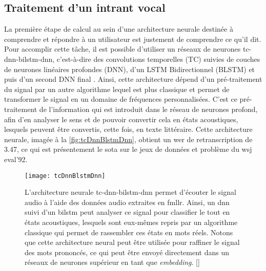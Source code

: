 \subsection{Traitement d'un intrant vocal}
La première étape de calcul au sein d’une architecture neurale destinée à comprendre et répondre à un utilisateur est justement de comprendre ce qu’il dit. Pour accomplir cette tâche, il est possible d’utiliser un réseaux de neurones \gls{tc}-\gls{dnn}-\gls{bilstm}-\gls{dnn}, c’est-à-dire des convolutions temporelles (TC) suivies de couches de neurones linéaires profondes (DNN), d’un LSTM Bidirectionnel (BLSTM) et puis d’un second DNN final \cite{acousticModeling}. Ainsi, cette architecture dépend d’un pré-traitement du signal par un autre algorithme lequel est plus classique et permet de transformer le signal en un domaine de fréquences personnalisées. C’est ce pré-traitement de l’information qui est introduit dans le réseau de neurones profond, afin d’en analyser le sens et de pouvoir convertir cela en états acoustiques, lesquels peuvent être convertis, cette fois, en texte littéraire. Cette architecture neurale, imagée à la \autoref{fig:tcDnnBlstmDnn}, obtient un \gls{wer} de retranscription de 3.47, ce qui est présentement le \gls{sota} sur le jeux de données et problème du \gls{wsj} eval’92.

\begin{figure*}
  \centering
  \texttt{[image: tcDnnBlstmDnn]}
  \caption{L’architecture neurale \gls{tc}-\gls{dnn}-\gls{bilstm}-\gls{dnn} permet d’écouter le signal audio à l’aide des données audio extraites en \gls{fmllr}. Ainsi, un \gls{dnn} suivi d’un \gls{bilstm} peut analyser ce signal pour classifier le tout en états acoustiques, lesquels sont eux-mêmes repris par un algorithme classique qui permet de rassembler ces états en mots réels. Notons que cette architecture neural peut être utilisée pour raffiner le signal des mots prononcés, ce qui peut être envoyé directement dans un réseaux de neurones supérieur en tant que \textit{embedding}. []}
  \label{fig:tcDnnBlstmDnn}
\end{figure*}
